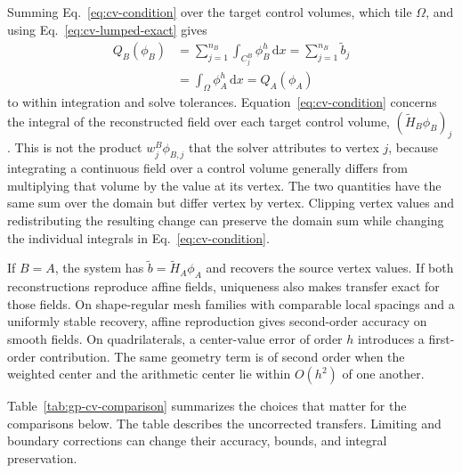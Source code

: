 \documentclass[a4paper,fleqn]{cas-sc}
\newcommand{\dd}{\,\mathrm{d}}
\begin{document}
Summing Eq.~\eqref{eq:cv-condition} over the target control volumes, which tile $\Omega$, and using Eq.~\eqref{eq:cv-lumped-exact} gives
\begin{equation}
 \begin{aligned}
 Q_B(\phi_B)&=\sum_{j=1}^{n_B}\int_{C_j^B}\phi_B^h\dd x
 =\sum_{j=1}^{n_B}\tilde b_j\\
 &=\int_\Omega\phi_A^h\dd x=Q_A(\phi_A)
 \end{aligned}
 \label{eq:cv-global}
\end{equation}
to within integration and solve tolerances. Equation~\eqref{eq:cv-condition} concerns the integral of the reconstructed field over each target control volume, $(\widetilde H_B\phi_B)_j$. This is not the product $w_j^B\phi_{B,j}$ that the solver attributes to vertex $j$, because integrating a continuous field over a control volume generally differs from multiplying that volume by the value at its vertex. The two quantities have the same sum over the domain but differ vertex by vertex. Clipping vertex values and redistributing the resulting change can preserve the domain sum while changing the individual integrals in Eq.~\eqref{eq:cv-condition}.

If $B=A$, the system has $\tilde b=\widetilde H_A\phi_A$ and recovers the source vertex values. If both reconstructions reproduce affine fields, uniqueness also makes transfer exact for those fields. On shape-regular mesh families with comparable local spacings and a uniformly stable recovery, affine reproduction gives second-order accuracy on smooth fields. On quadrilaterals, a center-value error of order $h$ introduces a first-order contribution. The same geometry term is of second order when the weighted center and the arithmetic center lie within $O(h^2)$ of one another.

Table~\ref{tab:gp-cv-comparison} summarizes the choices that matter for the comparisons below. The table describes the uncorrected transfers. Limiting and boundary corrections can change their accuracy, bounds, and integral preservation.
\end{document}
